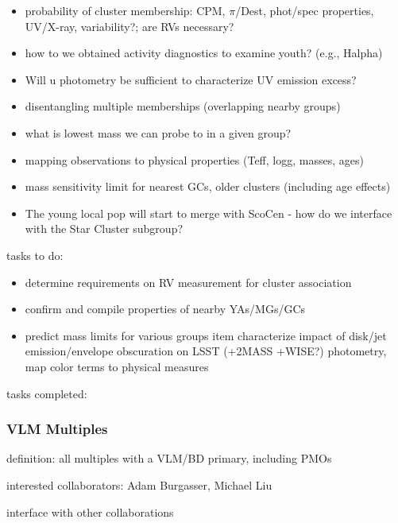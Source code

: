 \begin{itemize}
\item{
probability 
of cluster membership: CPM, $\pi$/Dest, phot/spec properties, UV/X-ray, 
variability?; are RVs necessary? }
\item{how 
to we obtained activity diagnostics to examine youth? (e.g., Halpha) }
\item{Will 
u photometry be sufficient to characterize UV emission excess? }
\item{disentangling 
multiple memberships (overlapping nearby groups) }
\item{what 
is lowest mass we can probe to in a given group? }
\item{mapping 
observations to physical properties (Teff, logg, masses, ages) }
\item{mass 
sensitivity limit for nearest GCs, older clusters (including age effects) }
\item{The 
young local pop will start to merge with ScoCen - how do we interface with the Star 
Cluster subgroup?}
\end{itemize}

tasks to do: 
\begin{itemize}
\item{ determine 
requirements on RV measurement for cluster association }
\item{
confirm 
and compile properties of nearby YAs/MGs/GCs }
\item{predict 
mass limits for various groups }
item{
characterize 
impact of disk/jet emission/envelope obscuration on LSST (+2MASS 
+WISE?) photometry, map color terms to physical measures}
\end{itemize}

tasks completed: 



\subsubsection{VLM Multiples}

definition: all multiples with a VLM/BD primary, including PMOs  

interested collaborators: 
Adam Burgasser,  Michael Liu

interface with other collaborations  

